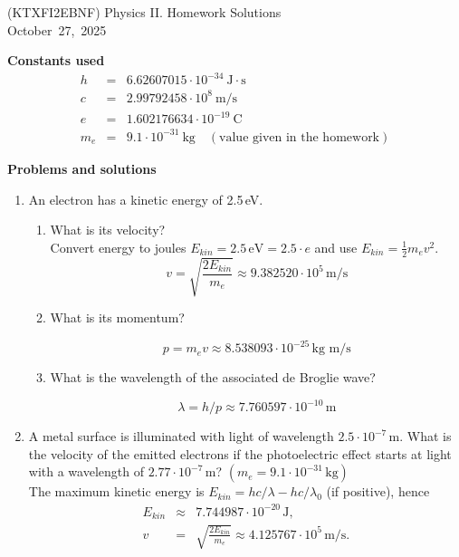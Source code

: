 \documentclass[a4paper,12pt]{letter}
\begin{document}
\begin{center}
(KTXFI2EBNF) Physics II.  Homework Solutions\\ \smallskip
October~27,~2025
 \end{center}


\textbf{Constants used}
\begin{eqnarray*}
h &=& 6.62607015\cdot10^{-34}\ \mathrm{J\cdot s} \\
c &=& 2.99792458\cdot10^{8}\ \mathrm{m/s} \\
e &=& 1.602176634\cdot10^{-19}\ \mathrm{C} \\
m_e &=& 9.1\cdot10^{-31}\ \mathrm{kg}\quad(\text{value given in the homework})
\end{eqnarray*}

\textbf{Problems and solutions}

\begin{enumerate}
    \item An electron has a kinetic energy of 2.5\,eV.
    \begin{enumerate}
    \item What is its velocity?\\

      Convert energy to joules $E_{kin}=2.5\,\text{eV}=2.5\cdot e$ and use $E_{kin}=\tfrac{1}{2}m_{e}v^{2}$.
      $$v = \sqrt{\frac{2E_{kin}}{m_e}} \approx 9.382520\cdot 10^{5}\,\text{m/s}$$
      
    \item What is its momentum?

    $$p=m_ev\approx 8.538093\cdot 10^{-25}\,\text{kg m/s}$$
      
  \item What is the wavelength of the associated de Broglie wave?
    
    $$\lambda=h/p\approx 7.760597\cdot10^{-10}\,\text{m}$$
\end{enumerate}

 \item A metal surface is illuminated with light of wavelength $2.5 \cdot 10^{-7}\,\text{m}$.  What is the velocity of the emitted electrons if the photoelectric effect starts at light with a wavelength of $2.77 \cdot 10^{-7}\,\text{m}$? $(m_{e} = 9.1 \cdot 10^{-31}\,\text{kg})$\\

 The maximum kinetic energy is $E_{kin}=hc/\lambda - hc/\lambda_{0}$ (if positive), hence
\begin{eqnarray*}
E_{kin} &\approx& 7.744987\cdot 10^{-20}\,\text{J},\\
v &=& \sqrt{\frac{2E_{kin}}{m_{e}}}\approx 4.125767\cdot 10^{5}\,\text{m/s}.
\end{eqnarray*}



\end{enumerate}
\end{document}
